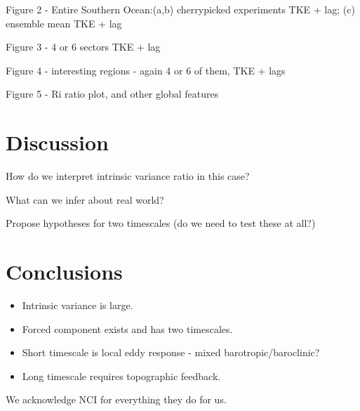 \documentclass{agujournal2019-navid}
\begin{document}
Figure 2 - Entire Southern Ocean:(a,b) cherrypicked experiments TKE + lag; (c) ensemble mean TKE + lag

Figure 3 - 4 or 6 sectors TKE + lag

Figure 4 - interesting regions - again 4 or 6 of them, TKE + lags

Figure 5 - Ri ratio plot, and other global features

\section{Discussion}
How do we interpret intrinsic variance ratio in this case?

What can we infer about real world?

Propose hypotheses for two timescales (do we need to test these at all?)



\section{Conclusions}
\begin{itemize}
    \item Intrinsic variance is large.
    \item  Forced component exists and has two timescales.
    \item Short timescale is local eddy response - mixed  barotropic/baroclinic?
    \item Long timescale requires topographic feedback.

\end{itemize}



\acknowledgments
We acknowledge NCI for everything they do for us.


\end{document}
